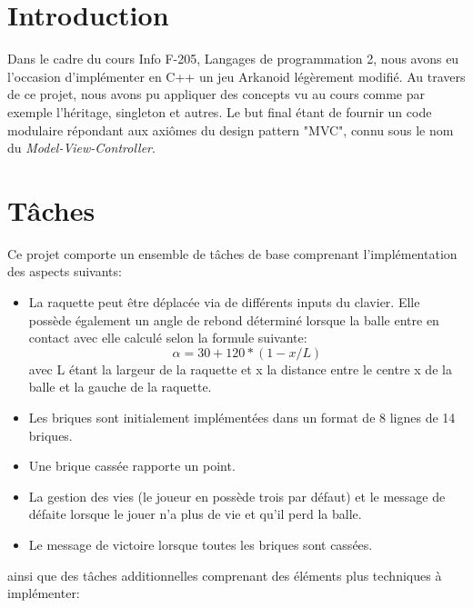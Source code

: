 \documentclass[utf8]{article}
\begin{document}
\newpage


\section{Introduction}
Dans le cadre du cours Info F-205, Langages de programmation 2, nous avons eu l'occasion d'implémenter en C++ un jeu Arkanoid légèrement modifié. Au travers de ce projet, nous avons pu appliquer des concepts vu au cours comme par exemple l'héritage, singleton et autres. Le but final étant de fournir un code modulaire répondant aux axiômes du design pattern "MVC", connu sous le nom du \emph{Model-View-Controller}.

\section{Tâches}
Ce projet comporte un ensemble de tâches de base comprenant l'implémentation des aspects suivants:
\begin{itemize}
    \item La raquette peut être déplacée via de différents inputs du clavier. Elle possède également un angle de rebond déterminé lorsque la balle entre en contact avec elle calculé selon la formule suivante:
    \begin{equation}
        \alpha{} = 30 + 120 * (1 - x /L) 
    \end{equation}
    avec L étant la largeur de la raquette et x la distance entre le centre x de la balle et la gauche de la raquette.
    \item Les briques sont initialement implémentées dans un format de 8 lignes de 14 briques.
    \item Une brique cassée rapporte un point.
    \item La gestion des vies (le joueur en possède trois par défaut) et le message de défaite lorsque le jouer n'a plus de vie et qu'il perd la balle.
    \item Le message de victoire lorsque toutes les briques sont cassées.
\end{itemize}
ainsi que des tâches additionnelles comprenant des éléments plus techniques à implémenter:
\end{document}
